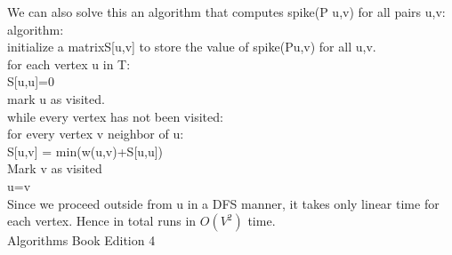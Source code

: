 \documentclass[10pt,letterpaper]{article}
\begin{document}
\begin{itemize}
We can also solve this an algorithm that computes spike(P u,v) for all pairs u,v:\\
algorithm:\\
initialize a matrixS[u,v] to store the value of spike(Pu,v) for all u,v.\\
for each vertex u in T:\\
S[u,u]=0\\
mark u as visited.\\
while every vertex has not been visited:\\
for every vertex v neighbor of u:\\
S[u,v] = min(w(u,v)+S[u,u])\\
Mark v as visited\\
u=v\\
Since we proceed outside from u in a DFS manner, it takes only linear time for each vertex. Hence in total runs in $O(V^2)$ time.\\

 Algorithms Book Edition 4

\end{itemize}
\end{document}
